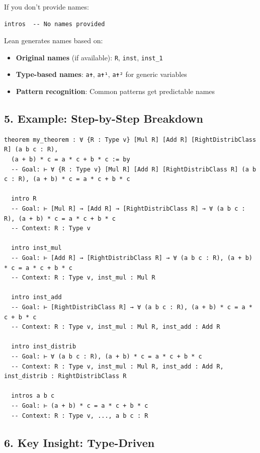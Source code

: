 \documentclass{amsart}
\theoremstyle{plain}
\theoremstyle{definition}
\theoremstyle{remark}
\begin{document}
If you don't provide names:

\begin{lstlisting}[language=lean]
intros  -- No names provided
\end{lstlisting}
Lean generates names based on:

\begin{itemize}
	\item \textbf{Original names} (if available): \lstinline{R}, \lstinline{inst}, \lstinline{inst_1}
	\item \textbf{Type-based names}: \lstinline{a✝}, \lstinline{a✝¹}, \lstinline{a✝²} for generic variables
	\item \textbf{Pattern recognition}: Common patterns get predictable names
\end{itemize}


\subsection{\textbf{5. Example: Step-by-Step Breakdown}}

\begin{lstlisting}[language=lean]
theorem my_theorem : ∀ {R : Type v} [Mul R] [Add R] [RightDistribClass R] (a b c : R), 
  (a + b) * c = a * c + b * c := by
  -- Goal: ⊢ ∀ {R : Type v} [Mul R] [Add R] [RightDistribClass R] (a b c : R), (a + b) * c = a * c + b * c
  
  intro R
  -- Goal: ⊢ [Mul R] → [Add R] → [RightDistribClass R] → ∀ (a b c : R), (a + b) * c = a * c + b * c
  -- Context: R : Type v
  
  intro inst_mul
  -- Goal: ⊢ [Add R] → [RightDistribClass R] → ∀ (a b c : R), (a + b) * c = a * c + b * c
  -- Context: R : Type v, inst_mul : Mul R
  
  intro inst_add
  -- Goal: ⊢ [RightDistribClass R] → ∀ (a b c : R), (a + b) * c = a * c + b * c
  -- Context: R : Type v, inst_mul : Mul R, inst_add : Add R
  
  intro inst_distrib
  -- Goal: ⊢ ∀ (a b c : R), (a + b) * c = a * c + b * c
  -- Context: R : Type v, inst_mul : Mul R, inst_add : Add R, inst_distrib : RightDistribClass R
  
  intros a b c
  -- Goal: ⊢ (a + b) * c = a * c + b * c
  -- Context: R : Type v, ..., a b c : R
\end{lstlisting}

\subsection{\textbf{6. Key Insight: Type-Driven}}
\end{document}
